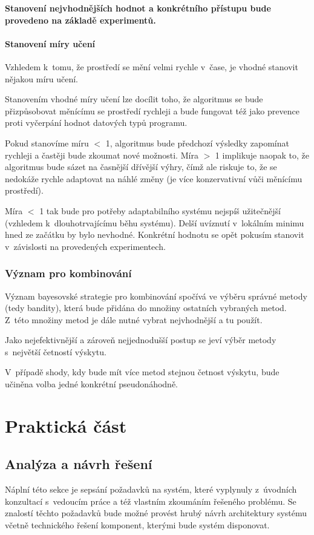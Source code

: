 \documentclass[thesis=M,czech]{FITthesis}[2014/05/07]
\begin{document}
\textbf{Stanovení nejvhodnějších hodnot a konkrétního přístupu bude provedeno na základě experimentů.}

\subsubsection{Stanovení míry učení}
\label{rate}
Vzhledem k~tomu, že prostředí se mění velmi rychle v~čase, je vhodné stanovit nějakou míru učení. 

Stanovením vhodné míry učení lze docílit toho, že algoritmus se bude přizpůsobovat měnícímu se prostředí rychleji a bude fungovat též jako prevence proti vyčerpání hodnot datových typů programu.

Pokud stanovíme míru $<$ 1, algoritmus bude předchozí výsledky zapomínat rychleji a častěji bude zkoumat nové možnosti. Míra $>$ 1 implikuje naopak to, že algoritmus bude sázet na časnější dřívější výhry, čímž ale riskuje to, že se nedokáže rychle adaptovat na náhlé změny (je více konzervativní vůči měnícímu prostředí).

Míra $<$ 1 tak bude pro potřeby adaptabilního systému nejspíš užitečnější (vzhledem k~dlouhotrvajícímu běhu systému). Delší uvíznutí v~lokálním minimu hned ze začátku by bylo nevhodné. Konkrétní hodnotu se opět pokusím stanovit v~závislosti na provedených experimentech.

\subsection{Význam pro kombinování}
\label{lkombinování}
Význam bayesovské strategie pro kombinování spočívá ve výběru správné metody (tedy bandity), která bude přidána do množiny ostatních vybraných metod. Z~této množiny metod je dále nutné vybrat nejvhodnější a tu použít.

Jako nejefektivnější a zároveň nejjednodušší postup se jeví výběr metody s~největší četností výskytu. 

V~případě shody, kdy bude mít více metod stejnou četnost výskytu, bude učiněna volba jedné konkrétní pseudonáhodně.

\chapter{Praktická část}
\label{chap:prakt}
\section{Analýza a návrh řešení}
\label{chap:analysis}
Náplní této sekce je sepsání požadavků na systém, které vyplynuly z~úvodních konzultací s~vedoucím práce a též vlastním zkoumáním řešeného problému. Se znalostí těchto požadavků bude možné provést hrubý návrh architektury systému včetně technického řešení komponent, kterými bude systém disponovat.
\end{document}
